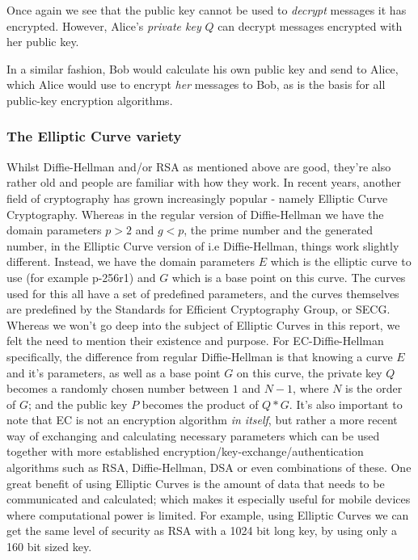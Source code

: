 Once again we see that the public key cannot be used to \textit{decrypt} messages it has encrypted. However, Alice's \textit{private key} $Q$ can decrypt messages encrypted with her public key.

In a similar fashion, Bob would calculate his own public key and send to Alice, which Alice would use to encrypt \textit{her} messages to Bob, as is the basis for all public-key encryption algorithms.

\subsubsection[The Elliptic Curve variety]{The Elliptic Curve variety}
Whilst Diffie-Hellman and/or RSA as mentioned above are good, they're also rather old and people are familiar with how they work. In recent years, another field of cryptography has grown increasingly popular - namely Elliptic Curve Cryptography\cite{rfc_EC_addendum}. Whereas in the regular version of Diffie-Hellman we have the domain parameters $p > 2$ and $g < p$, the prime number and the generated number, in the Elliptic Curve version of i.e Diffie-Hellman, things work slightly different.\cite{rfc_EC_DiffieHellman}
Instead, we have the domain parameters $E$ which is the elliptic curve to use (for example p-256r1)\cite{rfc_EC_curves} and $G$ which is a base point on this curve.
The curves used for this all have a set of predefined parameters, and the curves themselves are predefined by the Standards for Efficient Cryptography Group, or SECG.
Whereas we won't go deep into the subject of Elliptic Curves in this report, we felt the need to mention their existence and purpose. For EC-Diffie-Hellman specifically, the difference from regular Diffie-Hellman is that knowing a curve $E$ and it's parameters, as well as a base point $G$ on this curve, the private key $Q$ becomes a randomly chosen number between $1$ and $N-1$, where $N$ is the order of $G$; and the public key $P$ becomes the product of $Q*G$.
It's also important to note that EC is not an encryption algorithm \textit{in itself}, but rather a more recent way of exchanging and calculating necessary parameters which can be used together with more established encryption/key-exchange/authentication algorithms such as RSA, Diffie-Hellman, DSA or even combinations of these\cite{rfcEC_DHDSA,rfc_EC_DHRSA_ECDHERSA_ECDH}.
One great benefit of using Elliptic Curves is the amount of data that needs to be communicated and calculated; which makes it especially useful for mobile devices where computational power is limited.
For example, using Elliptic Curves we can get the same level of security as RSA with a 1024 bit long key, by using only a 160 bit sized key. \cite{ec_strength}


